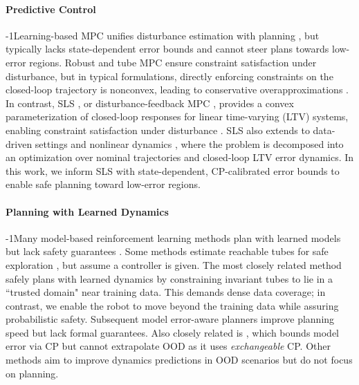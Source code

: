 \documentclass{l4dc2026}
\begin{document}
\paragraph{Predictive Control}
\looseness-1Learning-based MPC unifies disturbance estimation with planning \citep{hewing2020learning}, but typically lacks state-dependent error bounds and cannot steer plans towards low-error regions. Robust \citep{rawlings2017model} and tube MPC \citep{mayne2005robust} ensure constraint satisfaction under disturbance, but in typical formulations, directly enforcing constraints on the closed-loop trajectory is nonconvex, leading to conservative overapproximations \citep{singh2018robust}. In contrast, SLS \citep{anderson2019system,chen2024robust}, or disturbance-feedback MPC \citep{GOULART2006523}, provides a convex parameterization of closed-loop responses for linear time-varying (LTV) systems, enabling constraint satisfaction under disturbance \citep{bartos2025stochastic}. SLS also extends to data-driven settings \citep{xue2021data,furieri2022neural} and nonlinear dynamics \citep{leeman2025robust_TAC}, where the problem is decomposed into an optimization over nominal trajectories and closed-loop LTV error dynamics. In this work, we inform SLS with state-dependent, CP-calibrated error bounds to enable safe planning toward low-error regions.

\vspace{-8pt}
\paragraph{Planning with Learned Dynamics} 
\looseness-1Many model-based reinforcement learning methods plan with learned models but lack safety guarantees \citep{DBLP:journals/ftml/MoerlandBPJ23}. Some methods estimate reachable tubes for safe exploration \citep{berkenkamp2016safe}, but assume a controller is given. The most closely related method \citep{DBLP:conf/cdc/ChouOB21, chou2022safe} safely plans with learned dynamics by constraining invariant tubes to lie in a ``trusted domain" near training data. This demands dense data coverage; in contrast, we enable the robot to move beyond the training data while assuring probabilistic safety. Subsequent model error-aware planners \citep{DBLP:conf/corl/SuhCDYGT23} improve planning speed but lack formal guarantees. Also closely related is \cite{marques2024quantifyingaleatoricepistemicdynamics}, which bounds model error via CP but cannot extrapolate OOD as it uses \textit{exchangeable} CP. Other methods aim to improve dynamics predictions in OOD scenarios \citep{DBLP:journals/corr/abs-2403-12245} but do not focus on planning.
\end{document}
